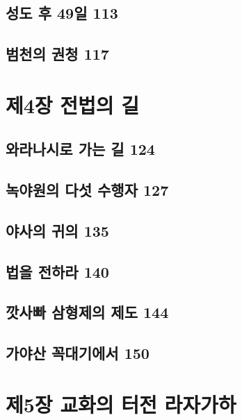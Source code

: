 \documentclass[12pt, a4paper, oneside]{book}
\let\stdsection\section
\renewcommand\section{\newpage\stdsection}
\begin{document}
	\section{성도 후 49일 113 }

	\section{범천의 권청 117}





	\chapter{제4장 전법의 길}
	\noptcrule
	\parttoc				

	\section{와라나시로 가는 길 124 }

	\section{녹야원의 다섯 수행자 127 }

	\section{야사의 귀의 135 }

	\section{법을 전하라 140 }

	\section{깟사빠 삼형제의 제도 144 }

	\section{가야산 꼭대기에서 150}





	\chapter{제5장 교화의 터전 라자가하}
	\noptcrule
	\parttoc				
\end{document}
